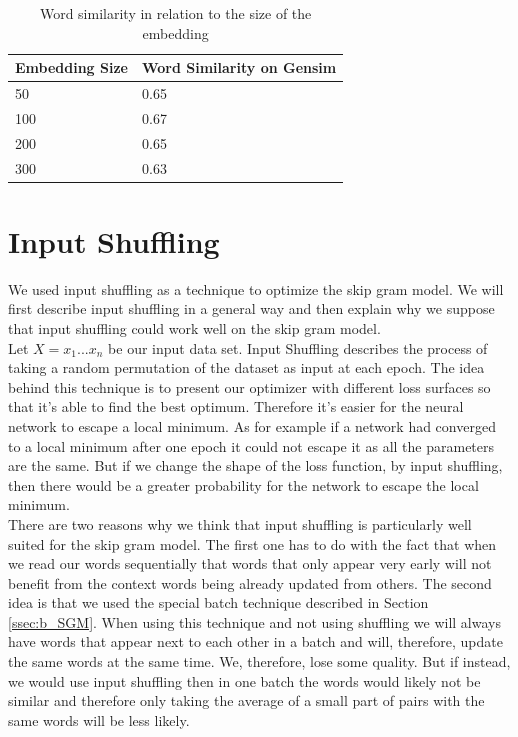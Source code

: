 \begin{table}[h]
\centering
\begin{tabular}{|l|l|}
\hline
Embedding Size & Word Similarity on Gensim \\ \hline
50 & 0.65 \\ \hline
100 & 0.67 \\ \hline
200 & 0.65 \\ \hline
300 & 0.63 \\ \hline
\end{tabular}
\caption{Word similarity in relation to the size of the embedding}
\label{table:gensim_emb_size}
\end{table}

\section{Input Shuffling}
We used input shuffling as a technique to optimize the skip gram model. We will first describe input shuffling in a general way and then explain why we suppose that input shuffling could work well on the skip gram model. \\
Let $X = {x_1...x_n}$ be our input data set. Input Shuffling describes the process of taking a random permutation of the dataset as input at each epoch. 
The idea behind this technique is to present our optimizer with different loss surfaces so that it's able to find the best optimum. Therefore it's easier for the neural network to escape a local minimum. As for example if a network had converged to a local minimum after one epoch it could not escape it as all the parameters are the same. But if we change the shape of the loss function, by input shuffling, then there would be a greater probability for the network to escape the local minimum.
\\
There are two reasons why we think that input shuffling is particularly well suited for the skip gram model. The first one has to do with the fact that when we read our words sequentially that words that only appear very early will not benefit from the context words being already updated from others. The second idea is that we used the special batch technique described in Section \ref{ssec:b_SGM}. When using this technique and not using shuffling we will always have words that appear next to each other in a batch and will, therefore, update the same words at the same time. We, therefore, lose some quality. But if instead, we would use input shuffling then in one batch the words would likely not be similar and therefore only taking the average of a small part of pairs with the same words will be less likely. 


